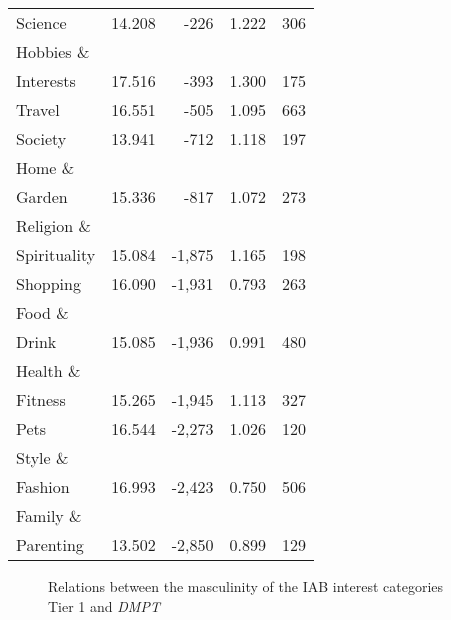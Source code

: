 \documentclass[twocolumn]{bmcart}\usepackage{lineno}
\begin{document}
\begin{center}
\begin{table}[!t]
\begin{adjustbox}{width=\columnwidth,center}
\begin{tabular}{|l|rrrr|}
                  Science &      14.208 &       -226 &               1.222 &        306 \\
      Hobbies \& &      &        &                &         \\
      Interests &     17.516 &       -393 &               1.300 &        175 \\
                   Travel &      16.551 &       -505 &               1.095 &        663 \\
                  Society &      13.941 &       -712 &               1.118 &        197 \\
            Home \& &      &        &                &         \\
            Garden &     15.336 &       -817 &               1.072 &        273 \\
  Religion \& &      &       &               &         \\
  Spirituality &     15.084 &      -1,875 &              1.165 &        198 \\
                 Shopping &      16.090 &      -1,931 &              0.793 &        263 \\
             Food \&  &      &       &               &         \\
             Drink &     15.085 &      -1,936 &              0.991 &        480 \\
         Health \&  &      &       &               &         \\
         Fitness &     15.265 &      -1,945 &              1.113 &        327 \\
                     Pets &      16.544 &      -2,273 &              1.026 &        120 \\
          Style \&  &      &       &               &         \\
          Fashion &     16.993 &      -2,423 &              0.750 &        506 \\
       Family \&  &      &       &               &         \\
       Parenting &     13.502 &      -2,850 &              0.899 &        129 \\
\hline
    \end{tabular}

\end{adjustbox}   
  \end{table}
\end{center}

\begin{figure}
\color{blue}
    \centering
\caption{Relations between the masculinity of the IAB interest categories Tier 1 and \emph{DMPT}}
    \label{fig:mascIabReg}
\color{black}
\end{figure}
\end{document}
